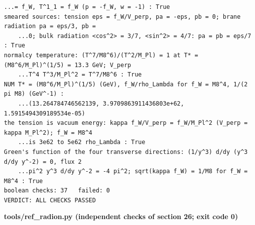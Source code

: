 \documentclass[10pt,a4paper]{article}
\begin{document}
\begin{Verbatim}[fontsize=\small,frame=single,framesep=2mm]
    ...= f_W, T^1_1 = f_W (p = -f_W, w = -1) : True
smeared sources: tension eps = f_W/V_perp, pa = -eps, pb = 0; brane radiation pa = eps/3, pb =
    ...0; bulk radiation <cos^2> = 3/7, <sin^2> = 4/7: pa = pb = eps/7 : True
normalcy temperature: (T^7/M8^6)/(T^2/M_Pl) = 1 at T* = (M8^6/M_Pl)^(1/5) = 13.3 GeV; V_perp
    ...T^4 T^3/M_Pl^2 = T^7/M8^6 : True
NUM T* = (M8^6/M_Pl)^(1/5) (GeV), f_W/rho_Lambda for f_W = M8^4, 1/(2 pi M8) (GeV^-1) :
    ...(13.264784746562139, 3.9709863911436803e+62, 1.5915494309189534e-05)
the tension is vacuum energy: kappa f_W/V_perp = f_W/M_Pl^2 (V_perp = kappa M_Pl^2); f_W = M8^4
    ...is 3e62 to 5e62 rho_Lambda : True
Green's function of the four transverse directions: (1/y^3) d/dy (y^3 d/dy y^-2) = 0, flux 2
    ...pi^2 y^3 d/dy y^-2 = -4 pi^2; sqrt(kappa f_W) = 1/M8 for f_W = M8^4 : True
boolean checks: 37   failed: 0
VERDICT: ALL CHECKS PASSED
\end{Verbatim}
\textbf{tools/ref\_radion.py (independent checks of section 26; exit code 0)}
\end{document}
